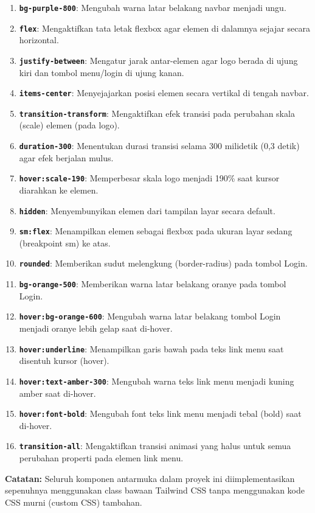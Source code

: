 \documentclass[12pt]{article}
\begin{document}
\begin{enumerate}
    \item \textbf{\texttt{bg-purple-800}}: Mengubah warna latar belakang navbar menjadi ungu.
    \item \textbf{\texttt{flex}}: Mengaktifkan tata letak flexbox agar elemen di dalamnya sejajar secara horizontal.
    \item \textbf{\texttt{justify-between}}: Mengatur jarak antar-elemen agar logo berada di ujung kiri dan tombol menu/login di ujung kanan.
    \item \textbf{\texttt{items-center}}: Menyejajarkan posisi elemen secara vertikal di tengah navbar.
    \item \textbf{\texttt{transition-transform}}: Mengaktifkan efek transisi pada perubahan skala (scale) elemen (pada logo).
    \item \textbf{\texttt{duration-300}}: Menentukan durasi transisi selama 300 milidetik (0,3 detik) agar efek berjalan mulus.
    \item \textbf{\texttt{hover:scale-190}}: Memperbesar skala logo menjadi 190\% saat kursor diarahkan ke elemen.
    \item \textbf{\texttt{hidden}}: Menyembunyikan elemen dari tampilan layar secara default.
    \item \textbf{\texttt{sm:flex}}: Menampilkan elemen sebagai flexbox pada ukuran layar sedang (breakpoint sm) ke atas.
    \item \textbf{\texttt{rounded}}: Memberikan sudut melengkung (border-radius) pada tombol Login.
    \item \textbf{\texttt{bg-orange-500}}: Memberikan warna latar belakang oranye pada tombol Login.
    \item \textbf{\texttt{hover:bg-orange-600}}: Mengubah warna latar belakang tombol Login menjadi oranye lebih gelap saat di-hover.
    \item \textbf{\texttt{hover:underline}}: Menampilkan garis bawah pada teks link menu saat disentuh kursor (hover).
    \item \textbf{\texttt{hover:text-amber-300}}: Mengubah warna teks link menu menjadi kuning amber saat di-hover.
    \item \textbf{\texttt{hover:font-bold}}: Mengubah font teks link menu menjadi tebal (bold) saat di-hover.
    \item \textbf{\texttt{transition-all}}: Mengaktifkan transisi animasi yang halus untuk semua perubahan properti pada elemen link menu.
\end{enumerate}

\noindent
\textbf{Catatan:} Seluruh komponen antarmuka dalam proyek ini diimplementasikan sepenuhnya menggunakan class bawaan Tailwind CSS tanpa menggunakan kode CSS murni (custom CSS) tambahan.
\end{document}
